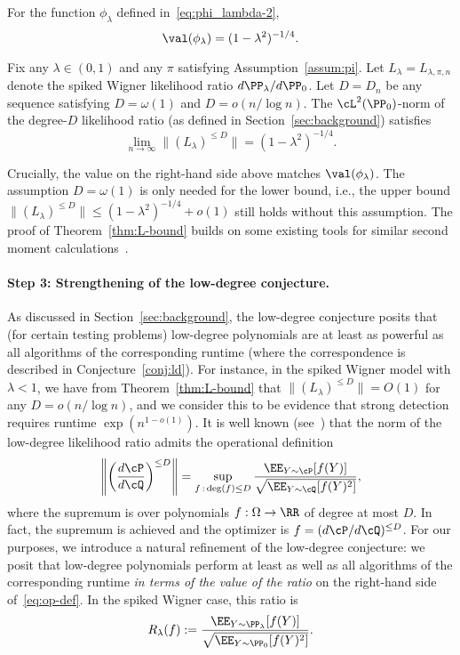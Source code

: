\documentclass[11pt]{article}
\begin{document}
\begin{lemma}\label{lem:calc-val}
For the function $\phi_\lambda$ defined in~\eqref{eq:phi_lambda-2},
\[ \val(\phi_\lambda) = (1-\lambda^2)^{-1/4}. \]
\end{lemma}

\begin{theorem}\label{thm:L-bound}
Fix any $\lambda \in (0,1)$ and any $\pi$ satisfying Assumption~\ref{assum:pi}. Let $L_\lambda = L_{\lambda,\pi,n}$ denote the spiked Wigner likelihood ratio $d\PP_\lambda/d\PP_0$. Let $D = D_n$ be any sequence satisfying $D = \omega(1)$ and $D = o(n/\log n)$. The $\cL^2(\PP_0)$-norm of the degree-$D$ likelihood ratio (as defined in Section~\ref{sec:background}) satisfies
\[ \lim_{n \to \infty} \|(L_\lambda)^{\le D}\| = (1-\lambda^2)^{-1/4}. \]
\end{theorem}

\noindent Crucially, the value on the right-hand side above matches $\val(\phi_\lambda)$. The assumption $D = \omega(1)$ is only needed for the lower bound, i.e., the upper bound $\|(L_\lambda)^{\le D}\| \le (1-\lambda^2)^{-1/4} + o(1)$ still holds without this assumption. The proof of Theorem~\ref{thm:L-bound} builds on some existing tools for similar second moment calculations~\cite{opt-subopt,sk-cert,ld-notes,spectral-planting,fp}.


\paragraph{Step 3: Strengthening of the low-degree conjecture.}

As discussed in Section~\ref{sec:background}, the low-degree conjecture posits that (for certain testing problems) low-degree polynomials are at least as powerful as all algorithms of the corresponding runtime (where the correspondence is described in Conjecture~\ref{conj:ld}). For instance, in the spiked Wigner model with $\lambda < 1$, we have from Theorem~\ref{thm:L-bound} that $\|(L_\lambda)^{\le D}\| = O(1)$ for any $D = o(n/\log n)$, and we consider this to be evidence that strong detection requires runtime $\exp(n^{1-o(1)})$. It is well known (see~\cite{hopkins-thesis,ld-notes}) that the norm of the low-degree likelihood ratio admits the operational definition
\begin{equation}\label{eq:op-def}
\left\|\left(\frac{d\cP}{d\cQ}\right)^{\le D}\right\| = \sup_{f \,:\, \deg(f) \le D} \frac{\EE_{Y \sim \cP}[f(Y)]}{\sqrt{\EE_{Y \sim \cQ}[f(Y)^2]}},
\end{equation}
where the supremum is over polynomials $f: \Omega \to \RR$ of degree at most $D$. In fact, the supremum is achieved and the optimizer is $f = (d\cP/d\cQ)^{\le D}$. For our purposes, we introduce a natural refinement of the low-degree conjecture: we posit that low-degree polynomials perform at least as well as all algorithms of the corresponding runtime \emph{in terms of the value of the ratio} on the right-hand side of~\eqref{eq:op-def}. In the spiked Wigner case, this ratio is
\begin{equation}\label{eq:def-R}
R_\lambda(f) := \frac{\EE_{Y \sim \PP_\lambda}[f(Y)]}{\sqrt{\EE_{Y \sim \PP_0}[f(Y)^2]}}.
\end{equation}
\end{document}
